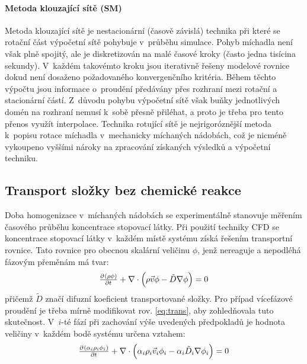 \paragraph{Metoda klouzající sítě (SM)}
Metoda klouzající sítě je nestacionární (časově závislá) technika při které se rotační část výpočetní sítě pohybuje v~průběhu simulace. Pohyb míchadla není však plně spojitý, ale je diskretizován na malé časové kroky (často jedna tisícina sekundy). V~každém takovémto kroku jsou iterativně řešeny modelové rovnice dokud není dosaženo požadovaného konvergenčního kritéria. Během těchto výpočtu jsou informace o~proudění předávány přes rozhraní mezi rotační a stacionární částí. Z~důvodu pohybu výpočetní sítě však buňky jednotlivých domén na rozhraní nemusí k~sobě přesně přiléhat, a proto je třeba pro tento přenos využít interpolace. Technika rotující sítě je nejrigoróznější metoda k~popisu rotace míchadla v~mechanicky míchaných nádobách, což je nicméně vykoupeno vyššími nároky na zpracování získaných výsledků a výpočetní techniku. 

\subsection{Transport složky bez chemické reakce}
Doba homogenizace v~míchaných nádobách se experimentálně stanovuje měřením časového průběhu koncentrace stopovací látky. Při použití techniky CFD se koncentrace stopovací látky v~každém místě systému získá řešením transportní rovnice. Tato rovnice pro obecnou skalární veličinu $\phi$, jenž nereaguje a nepodléhá fázovým přeměnám má tvar: 
\begin{equation}
	\pd{\kula{\rho \phi}}{t} + \nabla \cdot \kula{\rho\vec{v}\phi - \tilde{D}\nabla\phi} = 0
	\label{eq:trans}
\end{equation}  
přičemž $\tilde{D}$ značí difuzní koeficient transportované složky. Pro případ vícefázové proudění je třeba mírně modifikovat rov. \ref{eq:trans}, aby zohledňovala tuto skutečnost. V~$i$-té fází při zachování výše uvedených předpokladů je hodnota veličiny v~každém bodě systému určena vztahem:
\begin{equation}
	\pd{\kula{\alpha_{i} \rho_{i} \phi_{i}}}{t} + \nabla \cdot \kula{\alpha_{i} \rho_{i}\vec{v}_{i}\phi_{i} - \alpha_{i} \tilde{D}_{i}\nabla\phi_{i}} = 0
	\label{eq:trans_mix}
\end{equation}  
